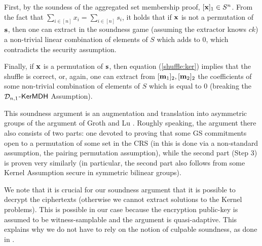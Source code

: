 First, by the soundess of the aggregated set membership proof, $[\mathbf{x}]_1 \in S^{n}$. From the fact that 
 $\sum_{i \in [n]} x_i =\sum_{i \in [n]} s_i$, it holds that if 
 $\mathbf{x}$ is not a permutation of $\mathbf{s}$, then one can extract in the soundness game (assuming the extractor knows $ck$) a non-trivial linear combination of elements of $S$ which adds to $0$, which contradicts the security assumption. 
 
Finally, if $\mathbf{x}$ is a permutation of $\mathbf{s}$,  then equation (\ref{shuffle:ker}) implies that the shuffle is correct, or, again, 
one can extract from   $[\mathbf{m}_1]_2,[\mathbf{m}_2]_2$ the coefficients of some non-trivial combination of elements of $S$ which is equal to $0$ (breaking the $\mathcal{D}_{n,1}$-$\mathsf{KerMDH}$ Assumption). 

This soundness argument is an augmentation and translation into asymmetric groups of the argument of Groth and Lu \cite{AC:GroLu07}. Roughly speaking, the argument there also consists of two parts: one devoted to proving that some GS commitments open to a permutation of some set in the CRS (in \cite{AC:GroLu07} this is done via a non-standard assumption, the pairing permutation assumption), while the second part (Step 3) is proven very similarly (in particular, the second part also follows from some Kernel Assumption secure in symmetric bilinear groups). 

We note that it is crucial for our soundness argument that it is possible to decrypt the ciphertexts (otherwise we cannot extract solutions to the Kernel problems). This is possible in our case because the encryption public-key is assumed to be witness-samplable and the argument is quasi-adaptive. This explains why we do not have to rely on the notion of culpable soundness, as done in \cite{AC:GroLu07,EPRINT:FauLip15}.


